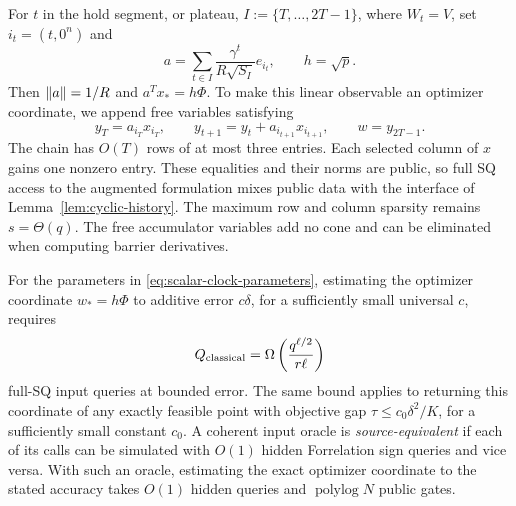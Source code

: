 For $t$ in the hold segment, or plateau, $I:=\{T,\ldots,2T-1\}$, where
$W_t=V$, set $i_t=(t,0^n)$ and
\begin{equation}\label{eq:public-readout}
 a=\sum_{t\in I}\frac{\gamma^t}{R\sqrt{S_I}}e_{i_t},
 \qquad h=\sqrt p.
\end{equation}
Then $\left\lVert a\right\rVert=1/R$ and $a^Tx_*=h\Phi$.
To make this linear observable an optimizer coordinate, we append free
variables satisfying
\begin{equation}\label{eq:accumulator}
 y_T=a_{i_T}x_{i_T},\qquad
 y_{t+1}=y_t+a_{i_{t+1}}x_{i_{t+1}},\qquad
 w=y_{2T-1}.
\end{equation}
The chain has $O(T)$ rows of at most three entries.  Each
selected column of $x$ gains one nonzero entry.  These equalities and
their norms are public, so full SQ access to the augmented formulation
mixes public data with the interface of
Lemma~\ref{lem:cyclic-history}.  The maximum row and column sparsity
remains $s=\Theta(q)$.  The free accumulator variables add no cone and can
be eliminated when computing barrier derivatives.

\begin{theorem}\label{thm:scalar-coordinate}
For the parameters in \eqref{eq:scalar-clock-parameters}, estimating the
optimizer coordinate $w_*=h\Phi$ to additive error $c\delta$, for a
sufficiently small universal $c$, requires
\begin{equation}\label{eq:scalar-coordinate-lower}
 Q_{\rm classical}=\Omega\left(\frac{q^{\ell/2}}{r\ell}\right)
\end{equation}
full-SQ input queries at bounded error.  The same bound applies to
returning this coordinate of any exactly feasible point with objective gap
$\tau\leq c_0\delta^2/K$, for a sufficiently small constant $c_0$.
A coherent input oracle is \emph{source-equivalent} if each of its calls
can be simulated with $O(1)$ hidden Forrelation sign queries and vice
versa.  With such an oracle, estimating the exact optimizer
coordinate to the stated accuracy takes $O(1)$ hidden
queries and $\operatorname{polylog}N$ public gates.
\end{theorem}


